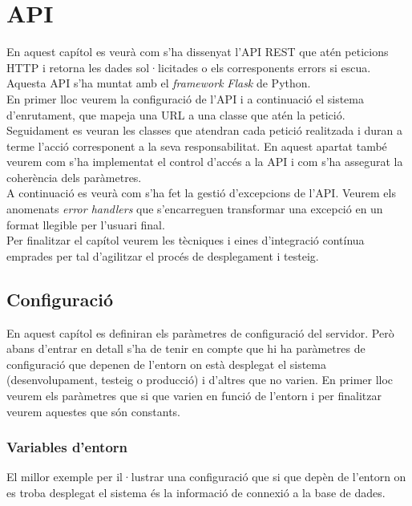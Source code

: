 \section{\ac{API}} \label{sec_api2}

En aquest capítol es veurà com s'ha dissenyat l'\ac{API} \ac{REST} que atén peticions \ac{HTTP} i retorna les dades sol·licitades o els corresponents errors si escua. Aquesta \ac{API} s'ha muntat amb el \emph{framework} \emph{Flask} de Python. \\

En primer lloc veurem la configuració de l'\ac{API} i a continuació el sistema d'enrutament, que mapeja una \ac{URL} a una classe que atén la petició.\\

Seguidament es veuran les classes que atendran cada petició realitzada i duran a terme l'acció corresponent a la seva responsabilitat. En aquest apartat també veurem com s'ha implementat el control d'accés a la \ac{API} i com s'ha assegurat la coherència dels paràmetres.\\

A continuació es veurà com s'ha fet la gestió d'excepcions de l'\ac{API}. Veurem els anomenats \emph{error handlers} que s'encarreguen transformar una excepció en un format llegible per l'usuari final.\\

Per finalitzar el capítol veurem les tècniques i eines d'integració contínua emprades per tal d'agilitzar el procés de desplegament i testeig.

\subsection{Configuració}

En aquest capítol es definiran els paràmetres de configuració del servidor. Però abans d'entrar en detall s'ha de tenir en compte que hi ha paràmetres de configuració que depenen de l'entorn on està desplegat el sistema (desenvolupament, testeig o producció) i d'altres que no varien. En primer lloc veurem els paràmetres que si que varien en funció de l'entorn i per finalitzar veurem aquestes que són constants.

\subsubsection{Variables d'entorn}

El millor exemple per il·lustrar una configuració que si que depèn de l'entorn on es troba desplegat el sistema és la informació de connexió a la base de dades.\\

